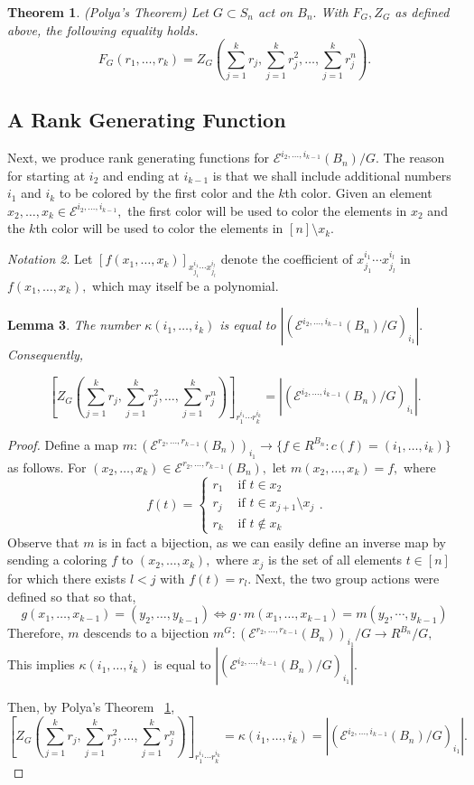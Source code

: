 \documentclass[10 pt]{amsart}
\theoremstyle{plain}
\newtheorem{thm}{Theorem}[section]
\newtheorem{lem}[thm]{Lemma}
\theoremstyle{definition}
\theoremstyle{remark}
\newtheorem{note}[thm]{Notation}
\numberwithin{equation}{section}
\newcommand\ssec{\subsection}
\renewcommand{\iff}{\Leftrightarrow}
\begin{document}
\begin{thm}
\label{thm:polya}
(Polya's Theorem)
 Let $G \subset S_n$ act on $B_n.$ With $F_G,Z_G$ as defined above, the following equality holds.
$$F_G(r_1,\ldots, r_k) = Z_G\left(\sum_{j=1}^k r_j,\sum_{j=1}^k r_j^2,\ldots, \sum_{j=1}^k r_j^n\right).$$
\end{thm}


\ssec{A Rank Generating Function}
Next, we produce rank generating functions for $\mathcal E^{i_2,\ldots,i_{k-1}}(B_n)/G.$ The reason for starting at $i_2$ and ending at $i_{k-1}$ is that we shall include additional numbers $i_1$ and $i_k$ to be colored by the first color and the $k$th color. Given an element $x_2,\ldots,x_k \in \mathcal E^{i_2,\ldots, i_{k-1}},$ the first color will be used to color the elements in $x_2$ and the $k$th color will be used to color the elements in $[n]\setminus x_k.$

\begin{note}
Let $[f(x_1,\ldots, x_k)]_{x_{j_1}^{i_1}\cdots x_{j_l}^{i_l}}$ denote the coefficient of $x_{j_1}^{i_1}\cdots x_{j_l}^{i_l}$ in $f(x_1,\ldots, x_k),$ which may itself be a polynomial.
\end{note}

\begin{lem}
\label{lem:polya_faces_equivlence}
The number $\kappa(i_1,\ldots, i_k)$ is equal to $|(\mathcal E^{i_2,\ldots, i_{k-1}}(B_n)/G)_{i_1}|.$ Consequently, 

$$\left[Z_G \left(\sum_{j=1}^k r_j,\sum_{j=1}^k r_j^2,\ldots, \sum_{j=1}^k r_j^n \right)\right]_{r_1^{i_1} \cdots r_k^{i_k}}=|(\mathcal E^{i_2,\ldots, i_{k-1}}(B_n)/G)_{i_1}|.$$
\end{lem}
\begin{proof}
Define a map $m:(\mathcal E^{r_2,\ldots, r_{k-1}}(B_n))_{i_1} \rightarrow \{f \in R^{B_n}:c(f) =(i_1,\ldots, i_k)\}$ as follows. For $(x_2,\ldots, x_{k}) \in \mathcal E^{r_2,\ldots, r_{k-1}}(B_n),$ let $m(x_2,\ldots, x_{k}) = f,$ where 
$$f(t) = \begin{cases} r_1 &\text{ if } t\in x_2\\
r_j &\text{ if } t \in x_{j+1}\setminus x_j\\
r_k &\text{ if } t \notin x_k
\end{cases}.$$
Observe that $m$ is in fact a bijection, as we can easily define an inverse map by sending a coloring $f$ to $(x_2,\ldots, x_{k}),$ where $x_j$ is the set of all elements $t \in [n]$ for which there exists $l < j$ with $f(t) = r_l.$
Next, the two group actions were defined so that so that, 
$$g(x_1,\ldots, x_{k-1}) = (y_2,\ldots, y_{k-1}) \iff g\cdot m(x_1,\ldots, x_{k-1}) = m(y_2, \cdots, y_{k-1})$$
Therefore, $m$ descends to a bijection $m^G:(\mathcal E^{r_2,\ldots, r_{k-1}}(B_n))_{i_1}/G \rightarrow R^{B_n}/G,$ This implies $\kappa(i_1,\ldots, i_k)$ is equal to $|(\mathcal E^{i_2,\ldots, i_{k-1}}(B_n)/G)_{i_1}|.$ 

Then, by Polya's Theorem ~\ref{thm:polya},  
$$\left[Z_G\left(\sum_{j=1}^k r_j,\sum_{j=1}^k r_j^2,\ldots, \sum_{j=1}^k r_j^n\right)\right]_{r_1^{i_1} \cdots r_k^{i_k}}=\kappa(i_1,\ldots, i_k)=|(\mathcal E^{i_2,\ldots, i_{k-1}}(B_n)/G)_{i_1}|.$$
\end{proof}
\end{document}
